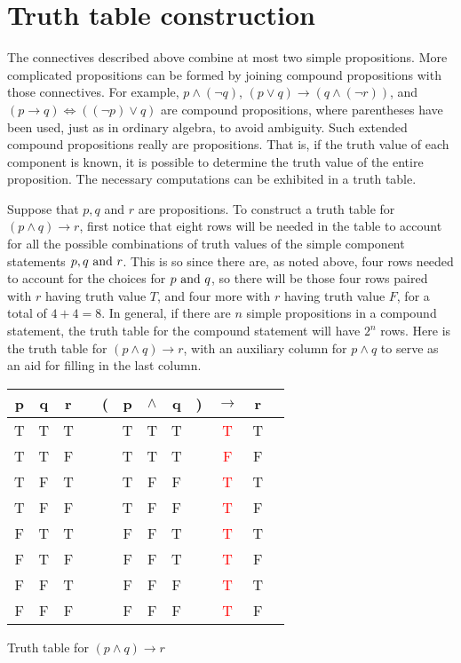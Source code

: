 \section{Truth table construction}
The connectives described above combine at most two simple propositions. 
More complicated propositions can be formed by joining  compound propositions with those
connectives.
For example, $p\land (\lnot q)$, $(p\lor q)\to (q\land (\lnot r))$, and
$(p\to q)\iff((\lnot p)\lor q)$ are compound propositions, where parentheses have been
used, just as in ordinary algebra, to avoid ambiguity.  
Such extended compound propositions really are propositions. That is, if the truth
value of each component is known, it is possible to determine the truth
value of the entire proposition. The necessary computations can be exhibited in a 
truth table.
\begin{exmp}Suppose that $p, q$ and $r$ are propositions. To construct a truth table for
$(p\wedge q)\to r$, first notice that eight rows will be needed in the table to account for
all the possible combinations of truth values of the simple component statements 
$p,q\hbox{ and } r$. This is so since there are, as noted above, four rows needed to account for the
choices for $p\hbox{ and }q$, so there will be those four rows paired with $r$ having truth value $T$, and four more with $r$ having truth value $F$, for a total of $4+4=8$. In general,
if there are $n$ simple propositions in a compound statement, the truth table for the compound statement will have $2^n$ rows.
Here is the truth table for $(p\wedge q)\to r$, with an auxiliary column for $p\wedge q$
to serve as an aid for filling in the last column.
\end{exmp}
\begin{margintable}
\begin{tabular}{@{ }c@{ }@{ }c@{ }@{ }c | c@{ }@{}c@{}@{ }c@{ }@{ }c@{ }@{ }c@{ }@{}c@{}@{ }c@{ }@{ }c@{ }@{ }c}
p & q & r &  & ( & p & $\land$ & q & ) & $\rightarrow$ & r & \\
\hline 
T & T & T &  &  & T & T & T &  & \textcolor{red}{T} & T & \\
T & T & F &  &  & T & T & T &  & \textcolor{red}{F} & F & \\
T & F & T &  &  & T & F & F &  & \textcolor{red}{T} & T & \\
T & F & F &  &  & T & F & F &  & \textcolor{red}{T} & F & \\
F & T & T &  &  & F & F & T &  & \textcolor{red}{T} & T & \\
F & T & F &  &  & F & F & T &  & \textcolor{red}{T} & F & \\
F & F & T &  &  & F & F & F &  & \textcolor{red}{T} & T & \\
F & F & F &  &  & F & F & F &  & \textcolor{red}{T} & F & \\
\end{tabular}
\caption{Truth table for $(p \land q) \to r$}
\label{tbl:p&q->r}
\end{margintable}

